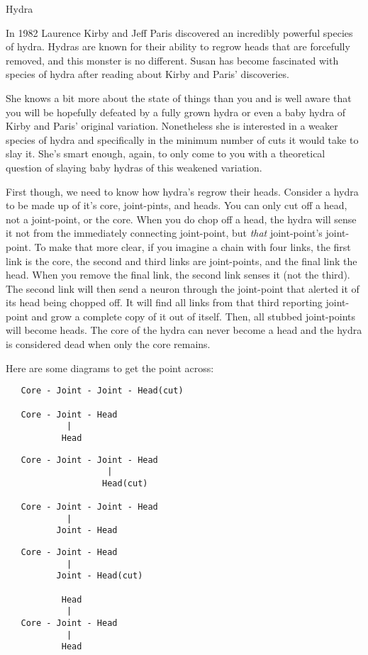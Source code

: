 \begin{problem}{Hydra}
\end{problem}
In 1982 Laurence Kirby and Jeff Paris discovered an incredibly powerful species of hydra.
Hydras are known for their ability to regrow heads that are forcefully removed, and this monster is no different.
Susan has become fascinated with species of hydra after reading about Kirby and Paris' discoveries.

She knows a bit more about the state of things than you and is well aware that you will be hopefully defeated by a fully grown hydra or even a baby hydra of Kirby and Paris' original variation.
Nonetheless she is interested in a weaker species of hydra and specifically in the minimum number of cuts it would take to slay it.
She's smart enough, again, to only come to you with a theoretical question of slaying baby hydras of this weakened variation.

First though, we need to know how hydra's regrow their heads.
Consider a hydra to be made up of it's core, joint-pints, and heads.
You can only cut off a head, not a joint-point, or the core.
When you do chop off a head, the hydra will sense it not from the immediately connecting joint-point, but \textit{that} joint-point's joint-point.
To make that more clear, if you imagine a chain with four links, the first link is the core, the second and third links are joint-points, and the final link the head.
When you remove the final link, the second link senses it (not the third).
The second link will then send a neuron through the joint-point that alerted it of its head being chopped off.
It will find all links from that third reporting joint-point and grow a complete copy of it out of itself.
Then, all stubbed joint-points will become heads.
The core of the hydra can never become a head and the hydra is considered dead when only the core remains.

Here are some diagrams to get the point across:

\begin{verbatim}
   Core - Joint - Joint - Head(cut)

   Core - Joint - Head
            |
           Head
\end{verbatim}
\begin{verbatim}
   Core - Joint - Joint - Head
                    |
                   Head(cut)

   Core - Joint - Joint - Head
            |
          Joint - Head
\end{verbatim}
\begin{verbatim}
   Core - Joint - Head
            |
          Joint - Head(cut)

           Head
            |
   Core - Joint - Head
            |
           Head
\end{verbatim}

